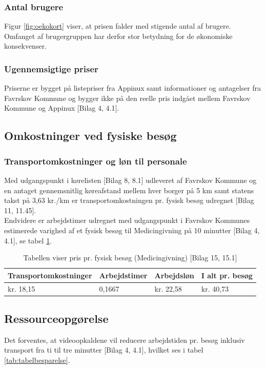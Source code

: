 \subsubsection{Antal brugere}
Figur \ref{fig:oekokort} viser, at prisen falder med stigende antal af brugere. Omfanget af brugergruppen har derfor stor betydning for de økonomiske konsekvenser. 

\subsubsection{Ugennemsigtige priser}
Priserne er bygget på listepriser fra Appinux samt informationer og antagelser fra Favrskov Kommune og bygger ikke på den reelle pris indgået mellem Favrskov Kommune og Appinux [Bilag 4, 4.1].  

\subsection{Omkostninger ved fysiske besøg}
\subsubsection{Transportomkostninger og løn til personale}
Med udgangspunkt i kørelisten [Bilag 8, 8.1] udleveret af Favrskov Kommune og en antaget gennemsnitlig køreafstand mellem hver borger på 5 km samt statens takst på 3,63 kr./km er transportomkostningen pr. fysisk besøg udregnet [Bilag 11, 11.45].\\
Endvidere er arbejdstimer udregnet med udgangspunkt i Favrskov Kommunes estimerede varighed af et fysisk besøg til Medicingivning på 10 minutter [Bilag 4, 4.1], se tabel \ref{tab:tabelfysiskbes}.

\begin{table}[H]
	\caption{Tabellen viser pris pr. fysisk besøg (Medicingivning) [Bilag 15, 15.1]}
	\centering
	\label{tab:tabelfysiskbes}
	\begin{tabular}{|l|l|l|l|}
		\hline
		\textbf{Transportomkostninger} & \textbf{Arbejdstimer } & \textbf{Arbejdsløn \cite{foa}} & \textbf{I alt pr. besøg}\\ \hline
		kr. 18,15 & 0,1667 & kr. 22,58 & kr. 40,73\\ \hline
	\end{tabular}
\end{table}


\subsection{Ressourceopgørelse}
Det forventes, at videoopkaldene vil reducere arbejdstiden pr. besøg inklusiv transport fra ti til tre minutter [Bilag 4, 4.1], hvilket ses i tabel \ref{tab:tabelbesparelse}.

